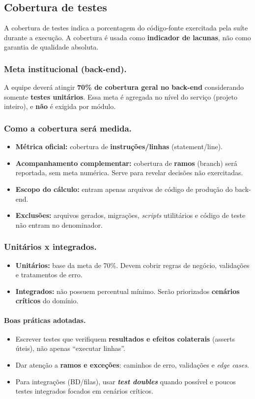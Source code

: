 \subsection{Cobertura de testes}

A cobertura de testes indica a porcentagem do código-fonte exercitada pela suíte durante a execução. A cobertura é usada como \textbf{indicador de lacunas}, não como garantia de qualidade absoluta.

\subsubsection{Meta institucional (back-end).}
A equipe deverá atingir \textbf{70\% de cobertura geral no back-end} considerando somente \textbf{testes unitários}. Essa meta é agregada no nível do serviço (projeto inteiro), e \textbf{não} é exigida por módulo.

\subsubsection{Como a cobertura será medida.}
\begin{itemize}
	\item \textbf{Métrica oficial:} cobertura de \textbf{instruções/linhas} (statement/line).
	\item \textbf{Acompanhamento complementar:} cobertura de \textbf{ramos} (branch) será reportada, sem meta numérica. Serve para revelar decisões não exercitadas.
	\item \textbf{Escopo do cálculo:} entram apenas arquivos de código de produção do back-end.
	\item \textbf{Exclusões:} arquivos gerados, migrações, \textit{scripts} utilitários e código de teste não entram no denominador.
\end{itemize}

\subsubsection{Unitários x integrados.}
\begin{itemize}
	\item \textbf{Unitários:} base da meta de 70\%. Devem cobrir regras de negócio, validações e tratamentos de erro.
	\item \textbf{Integrados:} não possuem percentual mínimo. Serão priorizados \textbf{cenários críticos} do domínio.
\end{itemize}

\paragraph{Boas práticas adotadas.}
\begin{itemize}
	\item Escrever testes que verifiquem \textbf{resultados e efeitos colaterais} (asserts úteis), não apenas “executar linhas”.
	\item Dar atenção a \textbf{ramos e exceções}: caminhos de erro, validações e \textit{edge cases}.
	\item Para integrações (BD/filas), usar \textbf{\textit{test doubles}} quando possível e poucos testes integrados focados em cenários críticos.
\end{itemize}
